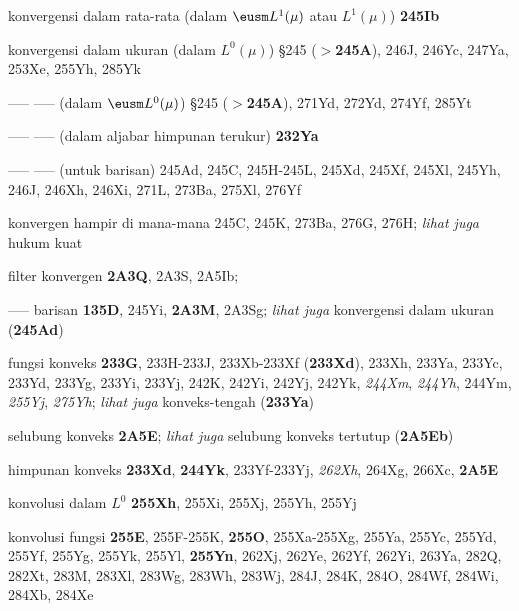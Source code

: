  konvergensi dalam rata-rata (dalam $\eusm L^1(\mu)$ atau $L^1(\mu)$) {\bf 245Ib}


 konvergensi dalam ukuran (dalam $L^0(\mu)$) \S245 ($\pmb{>}${\bf 245A}), 246J, 246Yc, 247Ya, 253Xe, 255Yh, 285Yk


----- ----- (dalam $\eusm L^0(\mu)$) \S245 ($\pmb{>}${\bf 245A}), 271Yd, 272Yd, 274Yf, 285Yt


----- ----- (dalam aljabar himpunan terukur) {\bf 232Ya}




----- ----- (untuk barisan) 245Ad, 245C, 245H-245L, 245Xd, 245Xf, 245Xl, 245Yh, 246J, 246Xh, 246Xi, 271L, 273Ba, 275Xl, 276Yf




 konvergen hampir di mana-mana 245C, 245K, 273Ba, 276G, 276H; {\it lihat juga} hukum kuat


filter konvergen {\bf 2A3Q}, 2A3S, 2A5Ib;  




{----- } barisan {\bf 135D}, 245Yi, {\bf 2A3M}, 2A3Sg; {\it lihat juga} konvergensi dalam ukuran ({\bf 245Ad})
  



 fungsi konveks {\bf 233G}, 233H-233J, 233Xb-233Xf ({\bf 233Xd}), 233Xh, 233Ya, 233Yc, 233Yd, 233Yg, 233Yi, 233Yj, 242K, 242Yi, 242Yj, 242Yk, {\it 244Xm}, {\it 244Yh}, 244Ym, {\it 255Yj}, {\it 275Yh}; {\it lihat juga} konveks-tengah ({\bf 233Ya})


selubung konveks {\bf 2A5E}; {\it lihat juga} selubung konveks tertutup ({\bf 2A5Eb})






himpunan konveks {\bf 233Xd}, {\bf 244Yk}, 233Yf-233Yj, {\it 262Xh}, 264Xg, 266Xc, {\bf 2A5E}











 konvolusi dalam $L^0$ {\bf 255Xh}, 255Xi, 255Xj, 255Yh, 255Yj


konvolusi fungsi {\bf 255E}, 255F-255K, {\bf 255O}, 255Xa-255Xg, 255Ya, 255Yc, 255Yd, 255Yf, 255Yg, 255Yk, 255Yl, {\bf 255Yn}, 262Xj, 262Ye, 262Yf, 262Yi, 263Ya, 282Q, 282Xt, 283M, 283Xl, 283Wg, 283Wh, 283Wj, 284J, 284K, 284O, 284Wf, 284Wi, 284Xb, 284Xe


